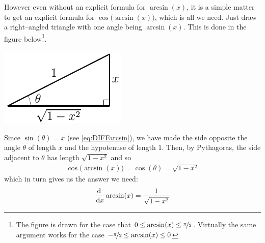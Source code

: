However even without an explicit formula for $\arcsin(x)$, it is a simple matter to get an
explicit formula for $\cos\big(\arcsin(x)\big)$, which is all we need. Just draw a
right--angled triangle with one angle being $\arcsin(x)$. This is done in the figure
below\footnote{The figure is drawn for the case that
$0\le\arcsin(x)\le\nicefrac{\pi}{2}$.
Virtually the same argument works for the case
$-\nicefrac{\pi}{2}\le\arcsin(x)\le 0$}.
\begin{efig}
\begin{center}
  \includegraphics{triangleAsin}
\end{center}
\end{efig}
Since $\sin(\theta)=x$ (see \eqref{eq:DIFFarcsin}),
we have made the side opposite the angle $\theta$ of length $x$ and the
hypotenuse of length $1$. Then, by Pythagoras, the side adjacent to $\theta$
has length $\sqrt{1-x^2}$ and so
\begin{align*}
\cos\big(\arcsin(x)\big)=\cos(\theta)=\sqrt{1-x^2}
\end{align*}
which in turn gives us the answer we need:
\begin{align*}%
\diff{}{x} \arcsin(x) =\frac{1}{\sqrt{1-x^2}}
\end{align*}

